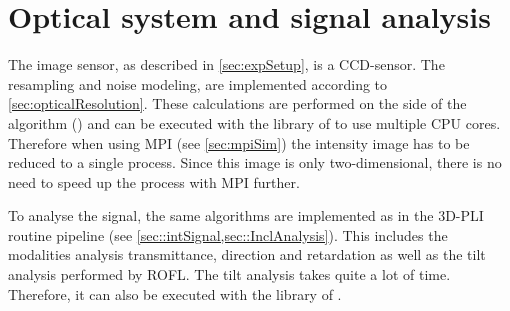 \section{Optical system and signal analysis}
\label{sec:ccdOptic}
%
The image sensor, as described in \cref{sec:expSetup}, is a \ac{CCD}-sensor.
The resampling and noise modeling, are implemented according to \cref{sec:opticalResolution}.
These calculations are performed on the \python{} side of the algorithm () and can be executed with the  library of \python{} to use multiple \ac{CPU} cores.
Therefore when using \ac{MPI} (see \cref{sec:mpiSim}) the intensity image has to be reduced to a single process.
Since this image is only two-dimensional, there is no need to speed up the process with \ac{MPI} further.
\par
%
To analyse the signal, the same algorithms are implemented as in the \ac{3D-PLI} routine pipeline (see \cref{sec::intSignal,sec::InclAnalysis}).
This includes the modalities analysis transmittance, direction and retardation as well as the tilt analysis performed by \ac{ROFL}.
The tilt analysis takes quite a lot of time.
Therefore, it can also be executed with the  library of \python{}.
%
%
%
